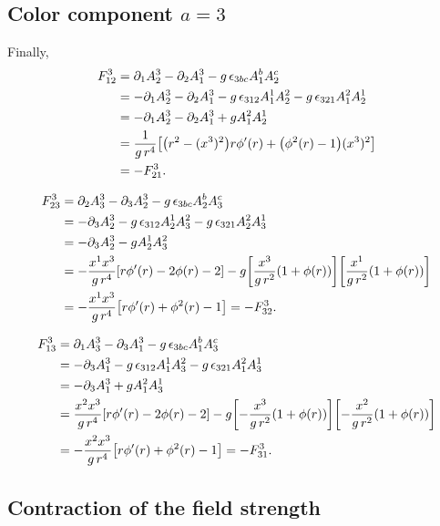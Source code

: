 \documentclass[12pt, a4paper]{article}
\begin{document}
\subsection*{Color component $a=3$}

Finally,
\[
\begin{aligned}
F_{12}^3
&=
\partial_1 A_2^3 - \partial_2 A_1^3 - g\,\epsilon_{3bc} A_1^b A_2^c \\
&=
-\partial_1 A_2^3 - \partial_2 A_1^3
- g\,\epsilon_{312} A_1^1 A_2^2
- g\,\epsilon_{321} A_1^2 A_2^1 \\
&=
-\partial_1 A_2^3 - \partial_2 A_1^3 + g A_1^2 A_2^1 \\
&=
\frac{1}{g\,r^4}
\qty[
\qty(r^2-(x^3)^2) r\phi'(r)
+ \qty(\phi^2(r)-1)(x^3)^2
] \\
&=
-F_{21}^3.
\end{aligned}
\]

\[
\begin{aligned}
F_{23}^3
&=
\partial_2 A_3^3 - \partial_3 A_2^3 - g\,\epsilon_{3bc} A_2^b A_3^c \\
&=
-\partial_3 A_2^3
- g\,\epsilon_{312} A_2^1 A_3^2
- g\,\epsilon_{321} A_2^2 A_3^1 \\
&=
-\partial_3 A_2^3 - g A_2^1 A_3^2 \\
&=
-\frac{x^1 x^3}{g\,r^4}\qty[r\phi'(r)-2\phi(r)-2]
- g\qty[\frac{x^3}{g\,r^2}\qty(1+\phi(r))]\qty[\frac{x^1}{g\,r^2}\qty(1+\phi(r))] \\
&=
-\frac{x^1 x^3}{g\,r^4}\qty[r\phi'(r)+\phi^2(r)-1]
= -F_{32}^3.
\end{aligned}
\]

\[
\begin{aligned}
F_{13}^3
&=
\partial_1 A_3^3 - \partial_3 A_1^3 - g\,\epsilon_{3bc} A_1^b A_3^c \\
&=
-\partial_3 A_1^3
- g\,\epsilon_{312} A_1^1 A_3^2
- g\,\epsilon_{321} A_1^2 A_3^1 \\
&=
-\partial_3 A_1^3 + g A_1^2 A_3^1 \\
&=
\frac{x^2 x^3}{g\,r^4}\qty[r\phi'(r)-2\phi(r)-2]
- g\qty[-\frac{x^3}{g\,r^2}\qty(1+\phi(r))]\qty[-\frac{x^2}{g\,r^2}\qty(1+\phi(r))] \\
&=
-\frac{x^2 x^3}{g\,r^4}\qty[r\phi'(r)+\phi^2(r)-1]
= -F_{31}^3.
\end{aligned}
\]

\subsection*{Contraction of the field strength}
\end{document}
